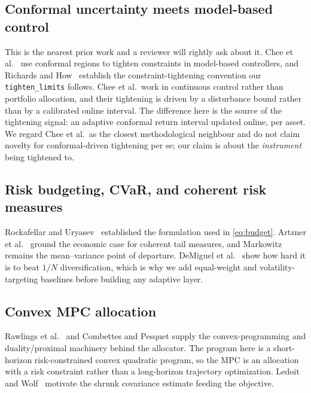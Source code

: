 \documentclass[journal]{IEEEtran}
\begin{document}
\subsection{Conformal uncertainty meets model-based control}
This is the nearest prior work and a reviewer will rightly ask about it. Chee et
al.~\cite{chee2024uncertainty} use conformal regions to tighten constraints in
model-based controllers, and Richards and How~\cite{richards2006robust} establish
the constraint-tightening convention our \texttt{tighten\_limits} follows. Chee et
al.\ work in continuous control rather than portfolio allocation, and their
tightening is driven by a disturbance bound rather than by a calibrated online
interval. The difference here is the source of the tightening signal: an adaptive
conformal return interval updated online, per asset. We regard Chee et al.\ as the
closest methodological neighbour and do not claim novelty for conformal-driven
tightening per se; our claim is about the \emph{instrument} being tightened to.

\subsection{Risk budgeting, CVaR, and coherent risk measures}
Rockafellar and Uryasev~\cite{rockafellar2000optimization} established the
formulation used in \cref{eq:budget}. Artzner et al.~\cite{artzner1999coherent}
ground the economic case for coherent tail measures, and Markowitz
\cite{markowitz1952portfolio} remains the mean--variance point of departure.
DeMiguel et al.~\cite{demiguel2009optimal} show how hard it is to beat $1/N$
diversification, which is why we add equal-weight and volatility-targeting
baselines before building any adaptive layer.

\subsection{Convex MPC allocation}
Rawlings et al.~\cite{boyd2004convex} and Combettes and Pesquet
\cite{combettes2011proximal} supply the convex-programming and
duality/proximal machinery behind the allocator. The program here is a
short-horizon risk-constrained convex quadratic program, so the MPC is an
allocation with a risk constraint rather than a long-horizon trajectory
optimization. Ledoit and Wolf~\cite{ledoit2004well} motivate the shrunk covariance
estimate feeding the objective.
\end{document}
